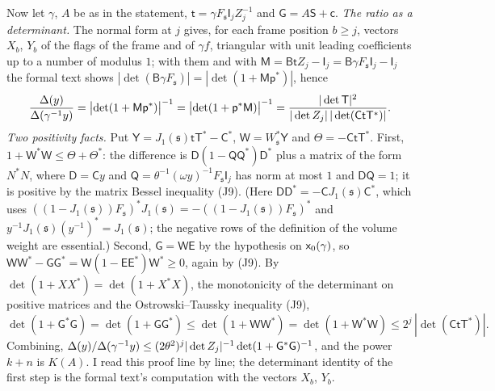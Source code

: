 \documentclass[11pt,a4paper]{article}
\makeatletter
\theoremstyle{plainx}
\theoremstyle{uprightx}
\renewenvironment{proof}[1][Proof]{\par\pushQED{\qed}\normalfont\topsep0pt\partopsep0pt
  \trivlist\item[\hskip\labelsep\itshape #1.]\ignorespaces}{\popQED\endtrivlist\@endpefalse}
\newcommand{\Jone}[1]{J_1(#1)}
\newcommand{\Inp}[1]{\textup{(#1)}}
\makeatother
\begin{document}
\begin{proof}[Proof of Theorem E]
Now let $\gamma$, $A$ be as in the statement, $\mathsf{t}=\gamma F_{\mathfrak{s}}\mathsf{I}_jZ_j^{-1}$ and
$\mathsf{G}=A\mathsf{S}+\mathsf{c}$. \emph{The ratio as a determinant.} The normal form at $j$ gives, for each frame
position $b\ge j$, vectors $X_b$, $Y_b$ of the flags of the frame and of $\gamma f$, triangular with unit leading
coefficients up to a number of modulus $1$; with them and with
$\mathsf{M}=\mathsf{B}\mathsf{t}Z_j-\mathsf{I}_j=\mathsf{B}\gamma F_{\mathfrak{s}}\mathsf{I}_j-\mathsf{I}_j$ the formal
text shows $|\det(\mathsf{B}\gamma F_{\mathfrak{s}})|=|\det(1+\mathsf{M}\mathsf{p}^{*})|$, hence
\[\frac{\Delta(y)}{\Delta(\gamma^{-1}y)}=\bigl|\det(1+\mathsf{M}\mathsf{p}^{*})\bigr|^{-1}=\bigl|\det(1+\mathsf{p}^{*}\mathsf{M})\bigr|^{-1}
=\frac{|\det\mathsf{T}|^{2}}{|\det Z_j|\,|\det(\mathsf{C}\mathsf{t}\mathsf{T}^{*})|}.\]
\emph{Two positivity facts.} Put $\mathsf{Y}=\Jone{\mathfrak{s}}\mathsf{t}\mathsf{T}^{*}-\mathsf{C}^{*}$,
$\mathsf{W}=W_{\mathfrak{s}}^{*}\mathsf{Y}$ and $\Theta=-\mathsf{C}\mathsf{t}\mathsf{T}^{*}$. First,
$1+\mathsf{W}^{*}\mathsf{W}\le\Theta+\Theta^{*}$: the difference is $\mathsf{D}(1-\mathsf{Q}\mathsf{Q}^{*})\mathsf{D}^{*}$
plus a matrix of the form $N^{*}N$, where $\mathsf{D}=\mathsf{C}y$ and
$\mathsf{Q}=\theta^{-1}(\omega y)^{-1}F_{\mathfrak{s}}\mathsf{I}_j$ has norm at most $1$ and
$\mathsf{D}\mathsf{Q}=1$; it is positive by the matrix Bessel inequality \Inp{J9}. (Here
$\mathsf{D}\mathsf{D}^{*}=-\mathsf{C}\Jone{\mathfrak{s}}\mathsf{C}^{*}$, which uses
$((1-\Jone{\mathfrak{s}})F_{\mathfrak{s}})^{*}\Jone{\mathfrak{s}}=-((1-\Jone{\mathfrak{s}})F_{\mathfrak{s}})^{*}$ and
$y^{-1}\Jone{\mathfrak{s}}(y^{-1})^{*}=\Jone{\mathfrak{s}}$; the negative rows of the definition of the volume weight
are essential.) Second,
$\mathsf{G}=\mathsf{W}\mathsf{E}$ by the hypothesis on $\mathsf{x}_0(\gamma)$, so
$\mathsf{W}\mathsf{W}^{*}-\mathsf{G}\mathsf{G}^{*}=\mathsf{W}(1-\mathsf{E}\mathsf{E}^{*})\mathsf{W}^{*}\ge0$, again by
\Inp{J9}. By $\det(1+XX^{*})=\det(1+X^{*}X)$, the monotonicity of the determinant on positive matrices and the
Ostrowski--Taussky inequality \Inp{J9},
\[\det(1+\mathsf{G}^{*}\mathsf{G})=\det(1+\mathsf{G}\mathsf{G}^{*})\le\det(1+\mathsf{W}\mathsf{W}^{*})=\det(1+\mathsf{W}^{*}\mathsf{W})
\le2^{j}\,|\det(\mathsf{C}\mathsf{t}\mathsf{T}^{*})|.\]
Combining, $\Delta(y)/\Delta(\gamma^{-1}y)\le(2\theta^{2})^{j}|\det Z_j|^{-1}\det(1+\mathsf{G}^{*}\mathsf{G})^{-1}$,
and the power $k+n$ is $K(A)$. I read this proof line by line; the determinant identity of the first step is the
formal text's computation with the vectors $X_b$, $Y_b$.
\end{proof}
\end{document}
